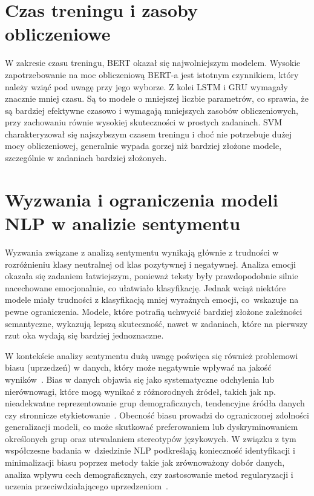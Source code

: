 \newpage
\section{Czas treningu i zasoby obliczeniowe}
W zakresie czasu treningu, BERT okazał się najwolniejszym modelem. Wysokie zapotrzebowanie na moc obliczeniową BERT-a jest istotnym czynnikiem, który należy wziąć pod uwagę przy jego wyborze. Z kolei LSTM i GRU wymagały znacznie mniej czasu. Są to modele o mniejszej liczbie parametrów, co sprawia, że są bardziej efektywne czasowo i wymagają mniejszych zasobów obliczeniowych, przy zachowaniu równie wysokiej skuteczności w prostych zadaniach. SVM charakteryzował się najszybszym czasem treningu i choć nie potrzebuje dużej mocy obliczeniowej, generalnie wypada gorzej niż bardziej złożone modele, szczególnie w zadaniach bardziej złożonych.

\section{Wyzwania i ograniczenia modeli NLP w analizie sentymentu}
Wyzwania związane z analizą sentymentu wynikają głównie z trudności w rozróżnieniu klasy neutralnej od klas pozytywnej i negatywnej. Analiza emocji okazała się zadaniem łatwiejszym, ponieważ teksty były prawdopodobnie silnie nacechowane emocjonalnie, co ułatwiało klasyfikację. Jednak wciąż niektóre modele miały trudności z klasyfikacją mniej wyraźnych emocji, co~wskazuje na pewne ograniczenia. Modele, które potrafią uchwycić bardziej złożone zależności semantyczne, wykazują lepszą skuteczność, nawet w zadaniach, które na pierwszy rzut oka wydają się bardziej jednoznaczne.

W kontekście analizy sentymentu dużą uwagę poświęca się również problemowi biasu (uprzedzeń) w danych, który może negatywnie wpływać na jakość wyników~\cite{Bias1}. Bias w danych objawia się jako systematyczne odchylenia lub nierównowagi, które mogą wynikać z różnorodnych źródeł, takich jak np. nieadekwatne reprezentowanie grup demograficznych, tendencyjne źródła danych czy stronnicze etykietowanie~\cite{Bias2}. Obecność biasu prowadzi do ograniczonej zdolności generalizacji modeli, co może skutkować preferowaniem lub dyskryminowaniem określonych grup oraz utrwalaniem stereotypów językowych. W związku z tym współczesne badania w~dziedzinie NLP podkreślają konieczność identyfikacji i minimalizacji biasu poprzez metody takie jak zrównoważony dobór danych, analiza wpływu cech demograficznych, czy zastosowanie metod regularyzacji i uczenia przeciwdziałającego uprzedzeniom~\cite{Bias3}.

